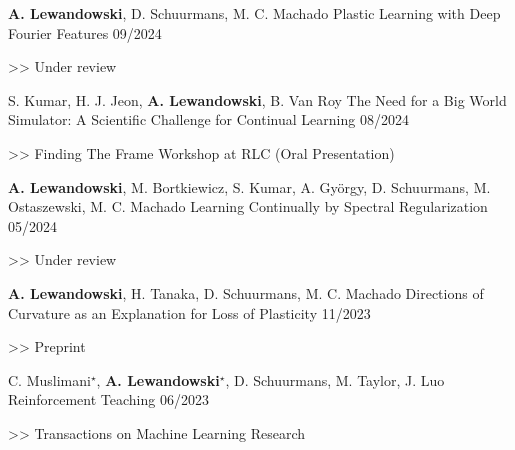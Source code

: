 \begin{cventries}

    \cventry
    {\textbf{A. Lewandowski}, D. Schuurmans, M. C. Machado}
    {Plastic Learning with Deep Fourier Features}
    {09/2024}
    {
      \begin{cvitems}
    	\item[>>] Under review
      \end{cvitems}
    }

    \cventry
    {S. Kumar, H. J. Jeon, \textbf{A. Lewandowski}, B. Van Roy}
    {The Need for a Big World Simulator: A Scientific Challenge for Continual Learning}
    {08/2024}
    {
      \begin{cvitems}
    	\item[>>] Finding The Frame Workshop at RLC (Oral Presentation)
      \end{cvitems}
    }

    \cventry
    {\textbf{A. Lewandowski}, M. Bortkiewicz, S. Kumar, A. György, D. Schuurmans, M. Ostaszewski, M. C. Machado}
    {Learning Continually by Spectral Regularization}
    {05/2024}
    {
      \begin{cvitems}
    	\item[>>] Under review
      \end{cvitems}
    }

    \cventry
    {\textbf{A. Lewandowski}, H. Tanaka, D. Schuurmans, M. C. Machado}
    {Directions of Curvature as an Explanation for Loss of Plasticity}
    {11/2023}
    {
      \begin{cvitems}
    	\item[>>] Preprint
      \end{cvitems}
    }

    \cventry
    {C. Muslimani$^{\star}$, \textbf{A. Lewandowski}$^\star$, D. Schuurmans, M. Taylor, J. Luo}
    {Reinforcement Teaching}
    {06/2023}
    {
      \begin{cvitems}
    	\item[>>] Transactions on Machine Learning Research
      \end{cvitems}
    }



\end{cventries}
